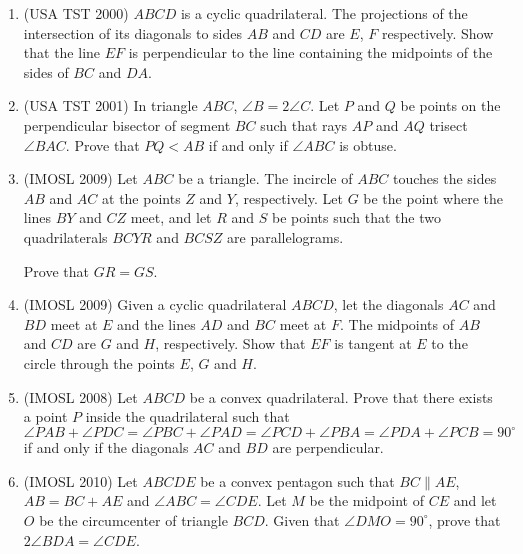 \documentclass[10pt]{article}
\theoremstyle{definition}
\theoremstyle{remark}
\begin{document}
\begin{enumerate}
\item (USA TST 2000) $ABCD$ is a cyclic quadrilateral. The projections of the intersection of its diagonals to sides $AB$ and $CD$ are $E$, $F$ respectively. Show that the line $EF$ is perpendicular to the line containing the midpoints of the sides of $BC$ and $DA$.

\item (USA TST 2001) In triangle $ABC$, $\angle B = 2\angle C$. Let $P$ and $Q$ be points on the perpendicular bisector of segment $BC$ such that rays $AP$ and $AQ$ trisect $\angle BAC$. Prove that $PQ < AB$ if and only if $\angle ABC$ is obtuse.

\item (IMOSL 2009) Let $ABC$ be a triangle. The incircle of $ABC$ touches the sides $AB$ and $AC$ at the points $Z$ and $Y$, respectively. Let $G$ be the point where the lines $BY$ and $CZ$ meet, and let $R$ and $S$ be points such that the two quadrilaterals $BCYR$ and $BCSZ$ are parallelograms.

Prove that $GR = GS$.

\item (IMOSL 2009) Given a cyclic quadrilateral $ABCD$, let the diagonals $AC$ and $BD$ meet at $E$ and the lines $AD$ and $BC$ meet at $F$. The midpoints of $AB$ and $CD$ are $G$ and $H$, respectively. Show that $EF$ is tangent at $E$ to the circle through the points $E$, $G$ and $H$.

\item (IMOSL 2008) Let $ABCD$ be a convex quadrilateral. Prove that there exists a point $P$ inside the quadrilateral such that 
$$\angle PAB+\angle PDC =\angle PBC+\angle PAD =\angle PCD+\angle PBA =\angle PDA+\angle PCB = 90^{\circ}$$
if and only if the diagonals $AC$ and $BD$ are perpendicular.

\item (IMOSL 2010) Let $ABCDE$ be a convex pentagon such that $BC\parallel AE$, $AB = BC + AE$ and $\angle ABC = \angle CDE$. Let $M$ be the midpoint of $CE$ and let $O$ be the circumcenter of triangle $BCD$. Given that $\angle DMO = 90^\circ$, prove that $2\angle BDA = \angle CDE$.

\end{enumerate}
\end{document}
